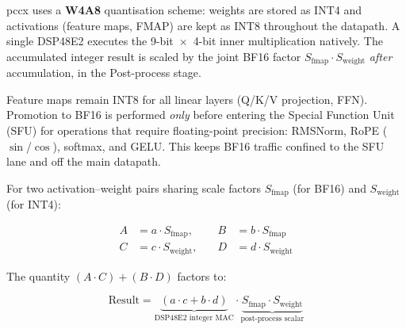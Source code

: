 \documentclass[11pt,a4paper,twoside,openany]{report}
\begin{document}
pccx uses a \textbf{W4A8} quantisation scheme: weights are stored as
INT4 and activations (feature maps, FMAP) are kept as INT8 throughout
the datapath.  A single DSP48E2 executes the 9-bit~$\times$~4-bit inner
multiplication natively.  The accumulated integer result is scaled by the
joint BF16 factor $S_{\mathrm{fmap}} \cdot S_{\mathrm{weight}}$
\textit{after} accumulation, in the Post-process stage.

Feature maps remain INT8 for all linear layers (Q/K/V projection, FFN).
Promotion to BF16 is performed \textit{only} before entering the Special
Function Unit (SFU) for operations that require floating-point precision:
RMSNorm, RoPE ($\sin$/$\cos$), softmax, and GELU.  This keeps BF16
traffic confined to the SFU lane and off the main datapath.

For two activation--weight pairs sharing scale factors
$S_{\mathrm{fmap}}$ (for BF16) and $S_{\mathrm{weight}}$ (for INT4):

\begin{equation}
\begin{aligned}
A &= a \cdot S_{\mathrm{fmap}}, \quad  &  B &= b \cdot S_{\mathrm{fmap}} \\
C &= c \cdot S_{\mathrm{weight}}, \quad  &  D &= d \cdot S_{\mathrm{weight}}
\end{aligned}
\end{equation}

The quantity $(A \cdot C) + (B \cdot D)$ factors to:

\begin{equation}
\mathrm{Result} = \underbrace{(a \cdot c + b \cdot d)}_{\text{DSP48E2 integer MAC}} \cdot \underbrace{S_{\mathrm{fmap}} \cdot S_{\mathrm{weight}}}_{\text{post-process scalar}}
\end{equation}
\end{document}
